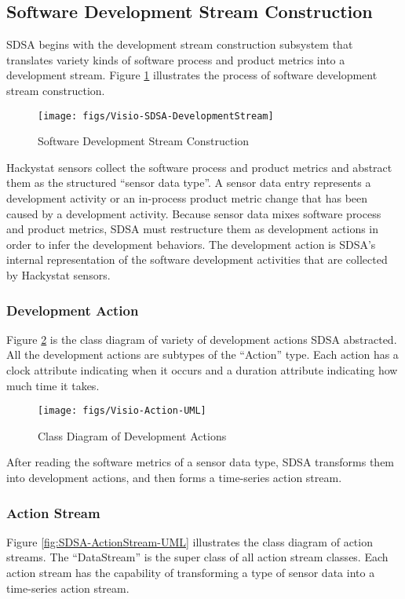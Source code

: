 \subsection{Software Development Stream Construction}
\label{sec:SDSA-Construction}
SDSA begins with the development stream construction subsystem 
that translates variety kinds of software process and product 
metrics into a development stream. Figure 
\ref{fig:SDSA-DevelopmentStream} illustrates the process
of software development stream construction. 
\begin{figure}[htbp]
  \centering
  \texttt{[image: figs/Visio-SDSA-DevelopmentStream]}
  \caption{Software Development Stream Construction}
  \label{fig:SDSA-DevelopmentStream}
\end{figure}

Hackystat sensors collect the software process and product
metrics and abstract them as the structured ``sensor data type''. 
A sensor data entry represents a development activity or an
in-process product metric change that has been caused by a development 
activity. Because sensor data mixes software process and product 
metrics, SDSA must restructure them as development actions in order 
to infer the development behaviors. The development action is 
SDSA's internal representation of the software development 
activities that are collected by Hackystat sensors. 

\subsubsection{Development Action}
Figure \ref{fig:SDSA-Action-UML} is the class diagram of variety of 
development actions SDSA abstracted. All the development actions 
are subtypes of the ``Action'' type. Each action has a clock 
attribute indicating when it occurs and a duration attribute 
indicating how much time it takes. 

\begin{figure}[htbp]
  \centering
  \texttt{[image: figs/Visio-Action-UML]}
  \caption{Class Diagram of Development Actions}
  \label{fig:SDSA-Action-UML}
\end{figure}

After reading the software metrics of a sensor data type, SDSA 
transforms them into development actions, and then forms 
a time-series action stream.

\subsubsection{Action Stream}
Figure \ref{fig:SDSA-ActionStream-UML} illustrates the class 
diagram of action streams. The ``DataStream'' is the super class 
of all action stream classes. Each action stream has the 
capability of transforming a type of sensor data into a 
time-series action stream. 

